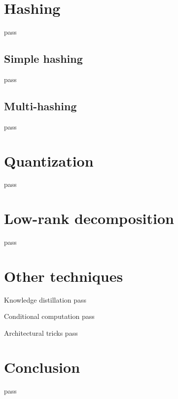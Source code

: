 \documentclass[10pt, handout]{beamer}
\begin{document}
\section{Hashing}
\begin{frame}
    pass
\end{frame}

\subsection{Simple hashing}
\begin{frame}
    pass
\end{frame}

\subsection{Multi-hashing}
\begin{frame}
    pass
\end{frame}

\section{Quantization}
\begin{frame}
    pass
\end{frame}

\section{Low-rank decomposition}
\begin{frame}
    pass
\end{frame}

\begin{frame}{}
    
\end{frame}

\section{Other techniques}
\begin{frame}{Knowledge distillation}
    pass
\end{frame}

\begin{frame}{Conditional computation}
    pass
\end{frame}

\begin{frame}{Architectural tricks}
    pass
\end{frame}

\section{Conclusion}
\begin{frame}
    pass
\end{frame}
\end{document}
